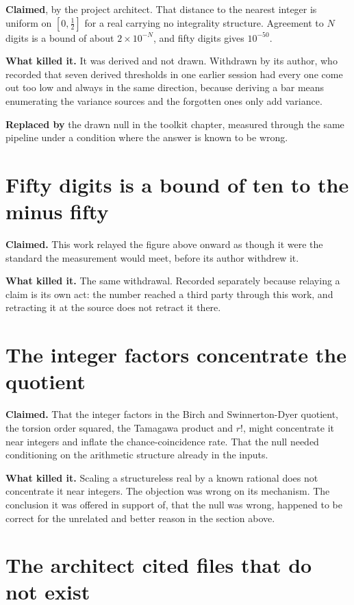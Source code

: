 \textbf{Claimed}, by the project architect. That distance to the nearest integer is uniform on
$[0,\tfrac12]$ for a real carrying no integrality structure. Agreement to $N$ digits is a bound
of about $2\times10^{-N}$, and fifty digits gives $10^{-50}$.

\textbf{What killed it.} It was derived and not drawn. Withdrawn by its author, who recorded
that seven derived thresholds in one earlier session had every one come out too low and always in
the same direction, because deriving a bar means enumerating the variance sources and the forgotten
ones only add variance.

\textbf{Replaced by} the drawn null in the toolkit chapter, measured through the same pipeline under
a condition where the answer is known to be wrong.

\section{Fifty digits is a bound of ten to the minus fifty}

\textbf{Claimed.} This work relayed the figure above onward as though it were the standard the
measurement would meet, before its author withdrew it.

\textbf{What killed it.} The same withdrawal. Recorded separately because relaying a claim is its
own act: the number reached a third party through this work, and retracting it at the source does
not retract it there.

\section{The integer factors concentrate the quotient}

\textbf{Claimed.} That the integer factors in the Birch and Swinnerton-Dyer quotient, the torsion
order squared, the Tamagawa product and $r!$, might concentrate it near integers and inflate the
chance-coincidence rate. That the null needed conditioning on the arithmetic structure already
in the inputs.

\textbf{What killed it.} Scaling a structureless real by a known rational does not concentrate it
near integers. The objection was wrong on its mechanism. The conclusion it was offered in support
of, that the null was wrong, happened to be correct for the unrelated and better reason in the
section above.

\section{The architect cited files that do not exist}

